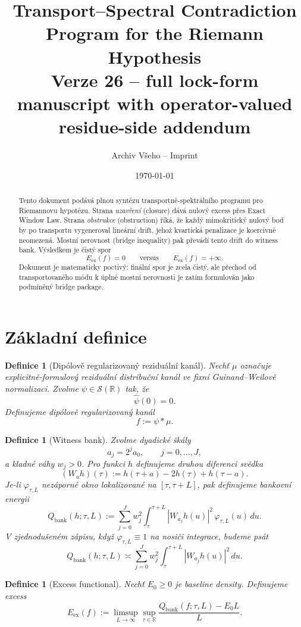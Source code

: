 \documentclass[11pt,a4paper]{article}
\title{Transport--Spectral Contradiction Program for the Riemann Hypothesis\\
\large Verze 26 -- full lock-form manuscript with operator-valued residue-side addendum}
\author{Archiv Všeho -- Imprint}
\date{\today}
\newtheorem{definition}[theorem]{Definice}
\begin{document}
\maketitle

\begin{abstract}
Tento dokument podává plnou syntézu transportně-spektrálního programu pro Riemannovu hypotézu.
Strana \emph{uzavření} (closure) dává nulový excess přes Exact Window Law.
Strana \emph{obstrukce} (obstruction) říká, že každý mimokritický nulový bod by po transportu
vygeneroval lineární drift, jehož kvartická penalizace je koercivně neomezená.
Mostní nerovnost (bridge inequality) pak převádí tento drift do witness bank.
Výsledkem je čistý spor
\[
E_{\mathrm{ex}}(f)=0
\qquad\text{versus}\qquad
E_{\mathrm{ex}}(f)=+\infty.
\]
Dokument je matematicky poctivý: finální spor je zcela čistý, ale přechod od transportovaného
módu k úplné mostní nerovnosti je zatím formulován jako podmíněný bridge package.
\end{abstract}

\section{Základní definice}

\begin{definition}[Dipólově regularizovaný reziduální kanál]
Nechť \(\mu\) označuje explicitně-formulový reziduální distribuční kanál ve fixní
Guinand--Weilově normalizaci. Zvolme \(\psi\in\mathscr{S}(\mathbb{R})\) tak, že
\[
\widehat{\psi}(0)=0.
\]
Definujeme dipólově regularizovaný kanál
\[
f:=\psi * \mu.
\]
\end{definition}

\begin{definition}[Witness bank]
Zvolme dyadické škály
\[
a_j=2^j a_0,\qquad j=0,\dots,J,
\]
a kladné váhy \(w_j>0\). Pro funkci \(h\) definujeme druhou diferenci svědka
\[
(W_a h)(\tau):=h(\tau+a)-2h(\tau)+h(\tau-a).
\]
Je-li \(\varphi_{\tau,L}\) nezáporné okno lokalizované na \([\tau,\tau+L]\), pak definujeme bankovní energii
\[
Q_{\mathrm{bank}}(h;\tau,L):=
\sum_{j=0}^{J} w_j^2 \int_{\tau}^{\tau+L} |W_{a_j}h(u)|^2\,\varphi_{\tau,L}(u)\,du.
\]
V zjednodušeném zápisu, když \(\varphi_{\tau,L}\equiv 1\) na nosiči integrace, budeme psát
\[
Q_{\mathrm{bank}}(h;\tau,L)\asymp
\sum_{j=0}^{J} w_j^2 \int_{\tau}^{\tau+L} |W_{a_j}h(u)|^2\,du.
\]
\end{definition}

\begin{definition}[Excess functional]
Nechť \(E_0\ge 0\) je baseline density. Definujeme excess
\[
E_{\mathrm{ex}}(f):=
\limsup_{L\to\infty}\sup_{\tau\in\mathbb{R}}
\frac{Q_{\mathrm{bank}}(f;\tau,L)-E_0L}{L}.
\]
\end{definition}
\end{document}
